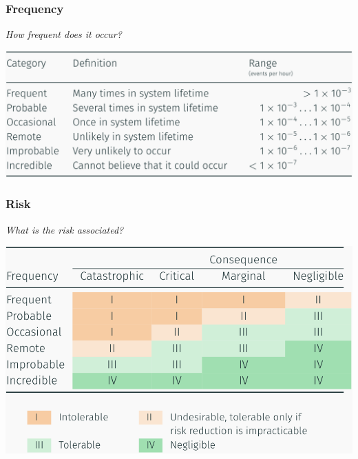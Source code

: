 \documentclass[
  10pt,
  a4paper,
]{article}
\begin{document}
\begin{multicols*}{2}
\begin{minipage}[c][1cm][c]{.7\columnwidth}

\subsubsection{Frequency}\label{frequency}

\vspace{-2mm}{\color{Orchid}\faQuestionCircle[regular]} \emph{How
frequent does it occur?}

\end{minipage}%
\begin{minipage}[c][1cm][c]{.3\columnwidth}
\makebox[30mm][r]{
\resizebox{!}{0.9cm}{
  
}}
\end{minipage}

\includegraphics{images/safety/image-4.png}

\begin{minipage}[c][1cm][c]{.7\columnwidth}

\subsubsection{Risk}\label{risk}

\vspace{-2mm}{\color{Orchid}\faQuestionCircle[regular]} \emph{What is
the risk associated?}

\end{minipage}%
\begin{minipage}[c][1cm][c]{.3\columnwidth}
\makebox[30mm][r]{
\resizebox{!}{0.9cm}{
  
}}
\end{minipage}

\includegraphics{images/safety/image-5.png}


\end{multicols*}
\end{document}
